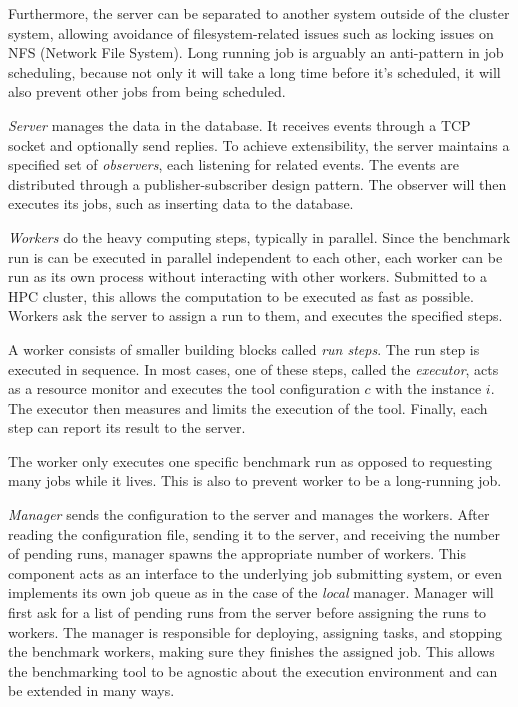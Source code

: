 Furthermore, the server can be separated to another system outside of the cluster system, allowing avoidance of filesystem-related issues such as locking issues on NFS (Network File System).
Long running job is arguably an anti-pattern in job scheduling, because not only it will take a long time before it's scheduled, it will also prevent other jobs from being scheduled.

\emph{Server} manages the data in the database.
It receives events through a TCP socket and optionally send replies.
To achieve extensibility, the server maintains a specified set of \emph{observers}, each listening for related events.
The events are distributed through a publisher-subscriber design pattern.
The observer will then executes its jobs, such as inserting data to the database.

\emph{Workers} do the heavy computing steps, typically in parallel.
Since the benchmark run is can be executed in parallel independent to each other, each worker can be run as its own process without interacting with other workers.
Submitted to a HPC cluster, this allows the computation to be executed as fast as possible.
Workers ask the server to assign a run to them, and executes the specified steps.

A worker consists of smaller building blocks called \emph{run steps}.
The run step is executed in sequence.
In most cases, one of these steps, called the \emph{executor}, acts as a resource monitor and executes the tool configuration $c$ with the instance $i$.
The executor then measures and limits the execution of the tool.
Finally, each step can report its result to the server.

The worker only executes one specific benchmark run as opposed to requesting many jobs while it lives.
This is also to prevent worker to be a long-running job.

\emph{Manager} sends the configuration to the server and manages the workers.
After reading the configuration file, sending it to the server, and receiving the number of pending runs, manager spawns the appropriate number of workers.
This component acts as an interface to the underlying job submitting system, or even implements its own job queue as in the case of the \emph{local} manager.
Manager will first ask for a list of pending runs from the server before assigning the runs to workers.
The manager is responsible for deploying, assigning tasks, and stopping the benchmark workers, making sure they finishes the assigned job.
This allows the benchmarking tool to be agnostic about the execution environment and can be extended in many ways.

